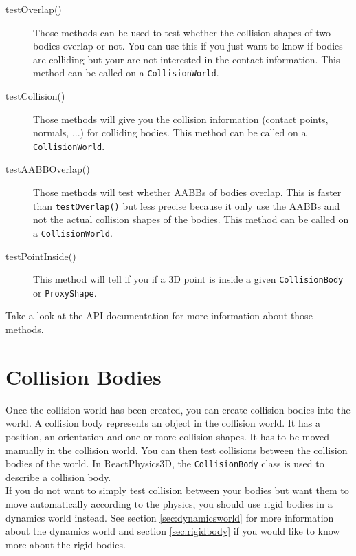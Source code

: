 \documentclass[a4paper,12pt]{article}
\begin{document}
    \begin{description}
       \item[testOverlap()] Those methods can be used to test whether the collision shapes of two bodies overlap or not. You can use this if you just want to
	       know if bodies are colliding but your are not interested in the contact information. This method can be called on a \texttt{CollisionWorld}.
       \item[testCollision()] Those methods will give you the collision information (contact points, normals, ...) for colliding bodies.
	                      This method can be called on a \texttt{CollisionWorld}. 
       \item[testAABBOverlap()] Those methods will test whether AABBs of bodies overlap. This is faster than \texttt{testOverlap()} but less precise because it only
	                                        use the AABBs and not the actual collision shapes of the bodies. This method can be called on a \texttt{CollisionWorld}.
					\item[testPointInside()] This method will tell if you if a 3D point is inside a given \texttt{CollisionBody} or \texttt{ProxyShape}. 
    \end{description}

    Take a look at the API documentation for more information about those methods.

    \section{Collision Bodies}

    Once the collision world has been created, you can create collision bodies into the world. A collision body represents an object in the collision world.
    It has a position, an orientation and one or more collision shapes. It has to be moved manually in the collision world. You can then
    test collisions between the collision bodies of the world. In ReactPhysics3D, the \texttt{CollisionBody} class is used to describe a collision body. \\

    If you do not want to simply test collision between your bodies but want them to move automatically according to the physics, you should use rigid bodies in a
    dynamics world instead. See section \ref{sec:dynamicsworld} for more information about the dynamics world and section \ref{sec:rigidbody} if you would like to know more
    about the rigid bodies.
\end{document}
